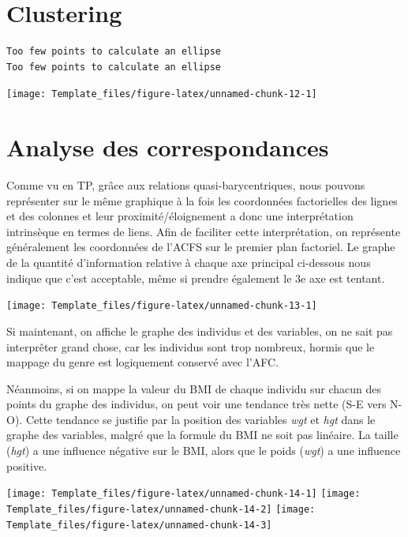 \documentclass[
]{article}
\begin{document}
\hypertarget{clustering}{%
\section{Clustering}\label{clustering}}

\begin{verbatim}
Too few points to calculate an ellipse
Too few points to calculate an ellipse
\end{verbatim}

\begin{center}\texttt{[image: Template\_files/figure-latex/unnamed-chunk-12-1]} \end{center}

\hypertarget{analyse-des-correspondances}{%
\section{Analyse des
correspondances}\label{analyse-des-correspondances}}

Comme vu en TP, grâce aux relations quasi-barycentriques, nous pouvons
représenter sur le même graphique à la fois les coordonnées factorielles
des lignes et des colonnes et leur proximité/éloignement a donc une
interprétation intrinsèque en termes de liens. Afin de faciliter cette
interprétation, on représente généralement les coordonnées de l'ACFS sur
le premier plan factoriel. Le graphe de la quantité d'information
relative à chaque axe principal ci-dessous nous indique que c'est
acceptable, même si prendre également le 3e axe est tentant.

\begin{center}\texttt{[image: Template\_files/figure-latex/unnamed-chunk-13-1]} \end{center}

Si maintenant, on affiche le graphe des individus et des variables, on
ne sait pas interprêter grand chose, car les individus sont trop
nombreux, hormis que le mappage du genre est logiquement conservé avec
l'AFC.

Néanmoins, si on mappe la valeur du BMI de chaque individu sur chacun
des points du graphe des individus, on peut voir une tendance très nette
(S-E vers N-O). Cette tendance se justifie par la position des variables
\emph{wgt} et \emph{hgt} dans le graphe des variables, malgré que la
formule du BMI ne soit pas linéaire. La taille (\emph{hgt}) a une
influence négative sur le BMI, alors que le poids (\emph{wgt}) a une
influence positive.

\texttt{[image: Template\_files/figure-latex/unnamed-chunk-14-1]}
\texttt{[image: Template\_files/figure-latex/unnamed-chunk-14-2]}
\texttt{[image: Template\_files/figure-latex/unnamed-chunk-14-3]}
\end{document}
